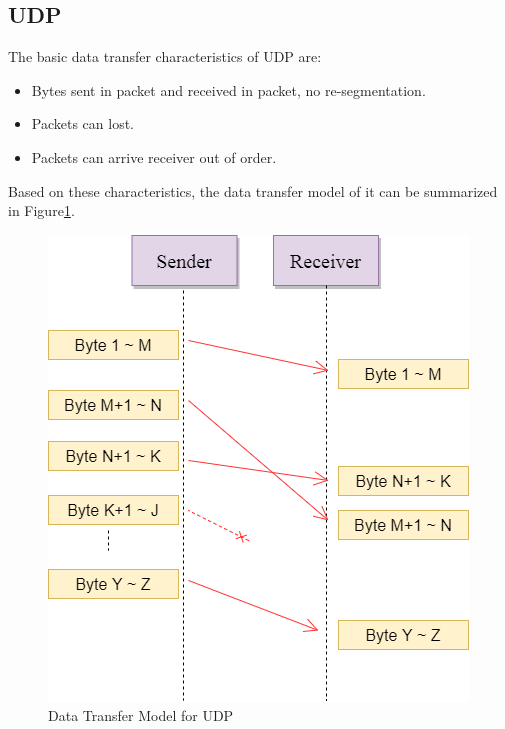 \subsection{UDP}
The basic data transfer characteristics of UDP are:
\begin{itemize}
  \item Bytes sent in packet and received in packet, no re-segmentation.
  \item Packets can lost.
  \item Packets can arrive receiver out of order.
\end{itemize}
Based on these characteristics, the data transfer model of it can be summarized in Figure\ref{upd}.
\begin{figure}[H]
\centerline{\includegraphics[scale=0.48]{Figures/udp}}
 \caption{Data Transfer Model for UDP}
\label{upd}
\end{figure}

